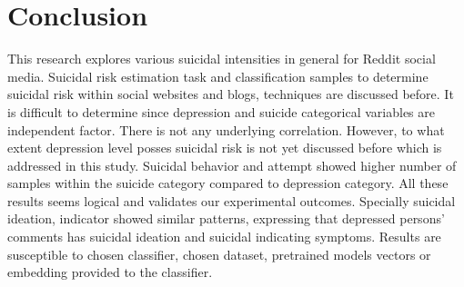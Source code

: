 \documentclass[sn-mathphys,Numbered]{sn-jnl}%
\theoremstyle{thmstyleone}%
\theoremstyle{thmstyletwo}%
\theoremstyle{thmstylethree}%
\begin{document}
%        
\section{Conclusion} 
\label{conclu}
This research explores various suicidal intensities in general for Reddit social media. Suicidal risk estimation task and classification samples to determine suicidal risk within social websites and blogs, techniques are discussed before. It is difficult to determine since depression and suicide categorical variables are independent factor. There is not any underlying correlation. However, to what extent depression level posses suicidal risk is not yet discussed before which is addressed in this study. Suicidal behavior and attempt showed higher number of samples within the suicide category compared to depression category. All these results seems logical and validates our experimental outcomes. Specially suicidal ideation, indicator showed similar patterns, expressing that depressed persons' comments has suicidal ideation and suicidal indicating symptoms. Results are susceptible to chosen classifier, chosen dataset, pretrained models vectors or embedding provided to the classifier. 
\end{document}
